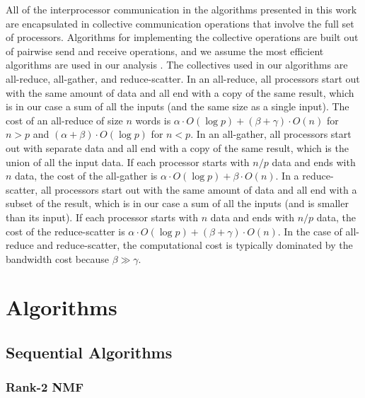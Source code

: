 \documentclass[conference,compsoc]{IEEEtran}
\begin{document}
All of the interprocessor communication in the algorithms presented in this work are encapsulated in collective communication operations that involve the full set of processors.
Algorithms for implementing the collective operations are built out of pairwise send and receive operations, and we assume the most efficient algorithms are used in our analysis \cite{TRG05,CH+07}.
The collectives used in our algorithms are all-reduce, all-gather, and reduce-scatter.
In an all-reduce, all processors start out with the same amount of data and all end with a copy of the same result, which is in our case a sum of all the inputs (and the same size as a single input).
The cost of an all-reduce of size $n$ words is $\alpha \cdot O(\log p) + (\beta+\gamma) \cdot O(n)$ for $n>p$ and $(\alpha+\beta) \cdot O(\log p)$ for $n<p$.
In an all-gather, all processors start out with separate data and all end with a copy of the same result, which is the union of all the input data.
If each processor starts with $n/p$ data and ends with $n$ data, the cost of the all-gather is $\alpha \cdot O(\log p) + \beta \cdot O(n)$.
In a reduce-scatter, all processors start out with the same amount of data and all end with a subset of the result, which is in our case a sum of all the inputs (and is smaller than its input).
If each processor starts with $n$ data and ends with $n/p$ data, the cost of the reduce-scatter is $\alpha \cdot O(\log p) + (\beta+\gamma) \cdot O(n)$.
In the case of all-reduce and reduce-scatter, the computational cost is typically dominated by the bandwidth cost because $\beta \gg \gamma$.

\section{Algorithms}

\subsection{Sequential Algorithms}

\subsubsection{Rank-2 NMF}
\label{sec:r2nmf}
\end{document}

